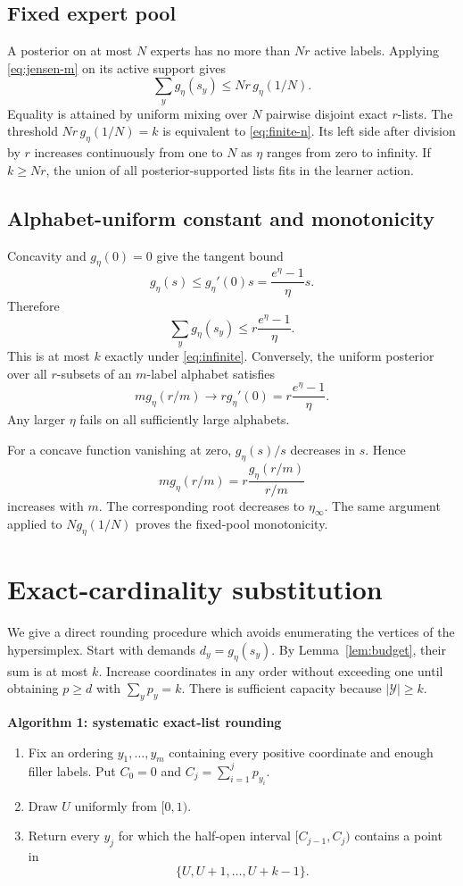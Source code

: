 \documentclass{article}
\theoremstyle{definition}
\theoremstyle{remark}
\newcommand{\cY}{\mathcal Y}
\newcommand{\1}{\mathbf 1}
\begin{document}
\subsection{Fixed expert pool}

A posterior on at most \(N\) experts has no more than \(Nr\) active labels. Applying \eqref{eq:jensen-m} on its active support gives \[ \sum_yg_\eta(s_y) \le Nr\,g_\eta(1/N). \] Equality is attained by uniform mixing over \(N\) pairwise disjoint exact \(r\)-lists. The threshold \(Nr\,g_\eta(1/N)=k\) is equivalent to \eqref{eq:finite-n}. Its left side after division by \(r\) increases continuously from one to \(N\) as \(\eta\) ranges from zero to infinity. If \(k\ge Nr\), the union of all posterior-supported lists fits in the learner action.

\subsection{Alphabet-uniform constant and monotonicity}

Concavity and \(g_\eta(0)=0\) give the tangent bound \[ g_\eta(s)\le g_\eta'(0)s =\frac{e^\eta-1}{\eta}s. \] Therefore \[ \sum_yg_\eta(s_y) \le r\frac{e^\eta-1}{\eta}. \] This is at most \(k\) exactly under \eqref{eq:infinite}. Conversely, the uniform posterior over all \(r\)-subsets of an \(m\)-label alphabet satisfies \[ m g_\eta(r/m)\longrightarrow r g_\eta'(0) =r\frac{e^\eta-1}{\eta}. \] Any larger \(\eta\) fails on all sufficiently large alphabets.

For a concave function vanishing at zero, \(g_\eta(s)/s\) decreases in \(s\). Hence \[ m g_\eta(r/m) =r\frac{g_\eta(r/m)}{r/m} \] increases with \(m\). The corresponding root decreases to \(\eta_\infty\). The same argument applied to \(N g_\eta(1/N)\) proves the fixed-pool monotonicity.

\section{Exact-cardinality substitution}
\label{app:rounding}

We give a direct rounding procedure which avoids enumerating the vertices of the hypersimplex. Start with demands \(d_y=g_\eta(s_y)\). By Lemma~\ref{lem:budget}, their sum is at most \(k\). Increase coordinates in any order without exceeding one until obtaining \(p\ge d\) with \(\sum_yp_y=k\). There is sufficient capacity because \(|\cY|\ge k\).

\begin{minipage}{0.94\linewidth}
\textbf{Algorithm 1: systematic exact-list rounding}
\begin{enumerate}
\item Fix an ordering \(y_1,\ldots,y_m\) containing every positive coordinate and enough filler labels. Put \(C_0=0\) and \(C_j=\sum_{i=1}^jp_{y_i}\).
\item Draw \(U\) uniformly from \([0,1)\).
\item Return every \(y_j\) for which the half-open interval \([C_{j-1},C_j)\) contains a point in
\[ \{U,U+1,\ldots,U+k-1\}. \]
\end{enumerate}
\end{minipage}
\end{document}
